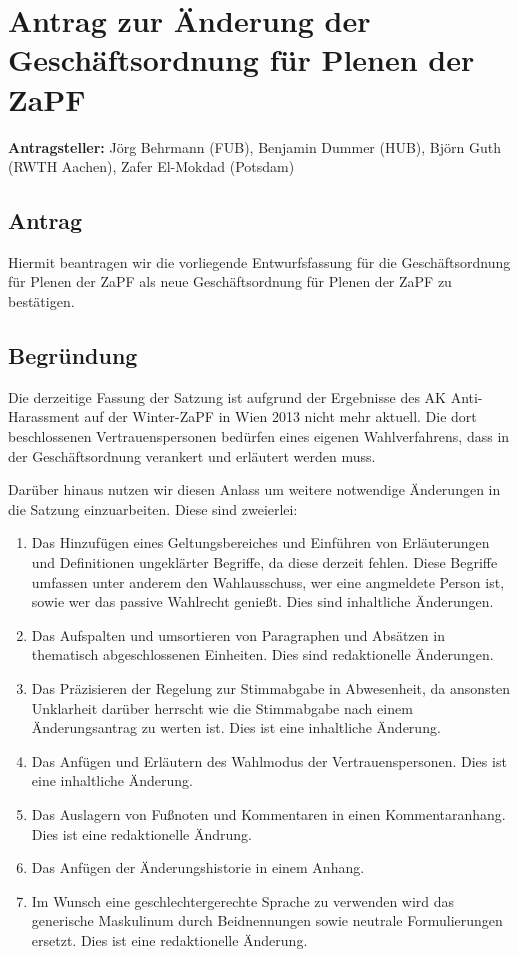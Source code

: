 \documentclass[draft,12pt,oneside]{scrartcl}
\begin{document}
\section*{Antrag zur Änderung der Geschäftsordnung für Plenen der ZaPF}

\textbf{Antragsteller:} Jörg Behrmann (FUB), Benjamin Dummer (HUB), Björn Guth (RWTH Aachen), Zafer El-Mokdad (Potsdam)

\subsection*{Antrag}

Hiermit beantragen wir die vorliegende Entwurfsfassung für die Geschäftsordnung für Plenen der ZaPF als neue
Geschäftsordnung für Plenen der ZaPF zu bestätigen.

\subsection*{Begründung}

Die derzeitige Fassung der Satzung ist aufgrund der Ergebnisse des AK Anti-Harassment auf der Winter-ZaPF in Wien
2013 nicht mehr aktuell. Die dort beschlossenen Vertrauenspersonen bedürfen eines eigenen Wahlverfahrens, dass
in der Geschäftsordnung verankert und erläutert werden muss.

Darüber hinaus nutzen wir diesen Anlass um weitere notwendige Änderungen in die Satzung einzuarbeiten. Diese sind
zweierlei:
\begin{enumerate}
\item Das Hinzufügen eines Geltungsbereiches und Einführen von Erläuterungen und Definitionen ungeklärter Begriffe, da
      diese derzeit fehlen. Diese Begriffe umfassen unter anderem den Wahlausschuss, wer eine angmeldete Person ist,
      sowie wer das passive Wahlrecht genießt.
      Dies sind inhaltliche Änderungen.
\item Das Aufspalten und umsortieren von Paragraphen und Absätzen in thematisch abgeschlossenen Einheiten.
      Dies sind redaktionelle Änderungen.
\item Das Präzisieren der Regelung zur Stimmabgabe in Abwesenheit, da ansonsten Unklarheit darüber herrscht
      wie die Stimmabgabe nach einem Änderungsantrag zu werten ist. Dies ist eine inhaltliche Änderung.
\item Das Anfügen und Erläutern des Wahlmodus der Vertrauenspersonen. Dies ist eine inhaltliche Änderung.
\item Das Auslagern von Fußnoten und Kommentaren in einen Kommentaranhang. Dies ist eine redaktionelle Ändrung.
\item Das Anfügen der Änderungshistorie in einem Anhang.
\item Im Wunsch eine geschlechtergerechte Sprache zu verwenden wird das generische Maskulinum durch Beidnennungen
      sowie neutrale Formulierungen ersetzt. Dies ist eine redaktionelle Änderung.
\end{enumerate}
\end{document}
